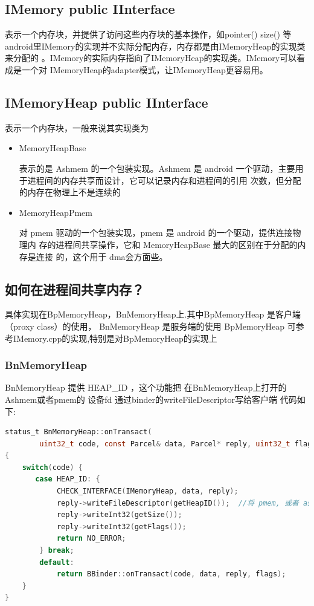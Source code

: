 \documentclass[a4paper,11pt]{article}
\begin{document}
\subsection{IMemory public IInterface}
表示一个内存块，并提供了访问这些内存块的基本操作，如pointer() size() 等
android里IMemory的实现并不实际分配内存，内存都是由IMemoryHeap的实现类来分配的
。IMemory的实际内存指向了IMemoryHeap的实现类。IMemory可以看成是一个对
IMemoryHeap的adapter模式，让IMemoryHeap更容易用。

\subsection{IMemoryHeap public IInterface}
表示一个内存块，一般来说其实现类为
\begin{itemize}
    \item MemoryHeapBase

        表示的是 Ashmem 的一个包装实现。Ashmem 是 android
        一个驱动，主要用于进程间的内存共享而设计，它可以记录内存和进程间的引用
        次数，但分配的内存在物理上不是连续的

    \item MemoryHeapPmem

        对 pmem 驱动的一个包装实现，pmem 是 android 的一个驱动，提供连接物理内
        存的进程间共享操作，它和 MemoryHeapBase 最大的区别在于分配的内存是连接
        的，这个用于 dma会方面些。
\end{itemize}

\subsection{ 如何在进程间共享内存？}
   具体实现在BpMemoryHeap，BnMemoryHeap上.其中BpMemoryHeap 是客户端（proxy class）的使用，
 BnMemoryHeap 是服务端的使用
  BpMemoryHeap
可参考IMemory.cpp的实现,特别是对BpMemoryHeap的实现上

\subsubsection{BnMemoryHeap}
  BnMemoryHeap  提供  HEAP_ID ，这个功能把 在BnMemoryHeap上打开的 Ashmem或者pmem的 设备fd 通过binder的writeFileDescriptor写给客户端
代码如下:
\begin{lstlisting}[language=c]
status_t BnMemoryHeap::onTransact(
        uint32_t code, const Parcel& data, Parcel* reply, uint32_t flags)
{
    switch(code) {
       case HEAP_ID: {
            CHECK_INTERFACE(IMemoryHeap, data, reply);
            reply->writeFileDescriptor(getHeapID());  //将 pmem, 或者 ashmem 的 fd 写给客户端
            reply->writeInt32(getSize());
            reply->writeInt32(getFlags());
            return NO_ERROR;
        } break;
        default:
            return BBinder::onTransact(code, data, reply, flags);
    }
}
\end{lstlisting}
\end{document}
